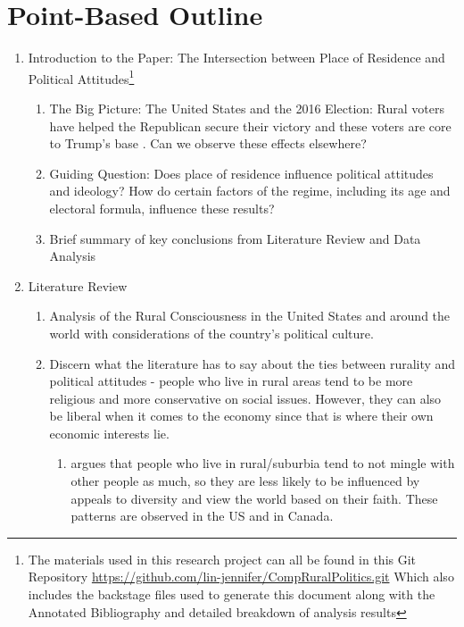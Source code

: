 \documentclass[12pt]{article}
\title{\tb{Place of Residence and Political Attitudes in Democracies Worldwide \\ {\large Point-Based Outline} }}
\author{Jennifer Lin}
\affil{Transitions to Democracy}
\begin{document}
\maketitle 

\section{Point-Based Outline}

\begin{enumerate}
\item Introduction to the Paper: The Intersection between Place of Residence and Political Attitudes\footnote{The materials used in this research project can all be found in this Git Repository \url{https://github.com/lin-jennifer/CompRuralPolitics.git} Which also includes the backstage files used to generate this document along with the Annotated Bibliography and detailed breakdown of analysis results}
\begin{enumerate}
	\item The Big Picture: The United States and the 2016 Election: Rural voters have helped the Republican secure their victory and these voters are core to Trump's base \citep{walsh_putting_2012}. Can we observe these effects elsewhere?
	\item Guiding Question: Does place of residence influence political attitudes and ideology? How do certain factors of the regime, including its age and electoral formula, influence these results?
	\item Brief summary of key conclusions from Literature Review and Data Analysis
\end{enumerate}
\item Literature Review
\begin{enumerate}
	\item Analysis of the Rural Consciousness in the United States and around the world with considerations of the country's political culture.
	\item Discern what the literature has to say about the ties between rurality and political attitudes - people who live in rural areas tend to be more religious and more conservative on social issues. However, they can also be liberal when it comes to the economy since that is where their own economic interests lie.
	\begin{enumerate}
		\item \cite{williamson_sprawl_2008} argues that people who live in rural/suburbia tend to not mingle with other people as much, so they are less likely to be influenced by appeals to diversity and view the world based on their faith. These patterns are observed in the US and in Canada.

\end{enumerate}
\end{enumerate}
\end{enumerate}
\end{document}
